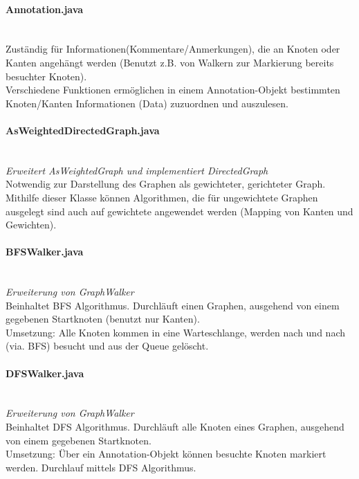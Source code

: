 \documentclass[10pt,a4paper]{article}
\begin{document}
\paragraph{Annotation.java}\ \\
Zuständig für Informationen(Kommentare/Anmerkungen), die an Knoten oder Kanten angehängt werden (Benutzt z.B. von Walkern zur Markierung bereits besuchter Knoten).\\
Verschiedene Funktionen ermöglichen in einem Annotation-Objekt bestimmten Knoten/Kanten Informationen (Data) zuzuordnen und auszulesen.\\

\paragraph{AsWeightedDirectedGraph.java}\ \\
\emph{Erweitert AsWeightedGraph und implementiert DirectedGraph}\\
Notwendig zur Darstellung des Graphen als gewichteter, gerichteter Graph.\\
Mithilfe dieser Klasse können Algorithmen, die für ungewichtete Graphen ausgelegt sind auch auf gewichtete angewendet werden (Mapping von Kanten und Gewichten).\\

\paragraph{BFSWalker.java}\ \\
\emph{Erweiterung von GraphWalker}\\
Beinhaltet BFS Algorithmus. Durchläuft einen Graphen, ausgehend von einem gegebenen Startknoten (benutzt nur Kanten).\\
Umsetzung: Alle Knoten kommen in eine Warteschlange, werden nach und nach (via. BFS) besucht und aus der Queue gelöscht.\\

\paragraph{DFSWalker.java}\ \\
\emph{Erweiterung von GraphWalker}\\
Beinhaltet DFS Algorithmus. Durchläuft alle Knoten eines Graphen, ausgehend von einem gegebenen Startknoten.\\
Umsetzung: Über ein Annotation-Objekt können besuchte Knoten markiert werden. Durchlauf mittels DFS Algorithmus.\\
\end{document}
